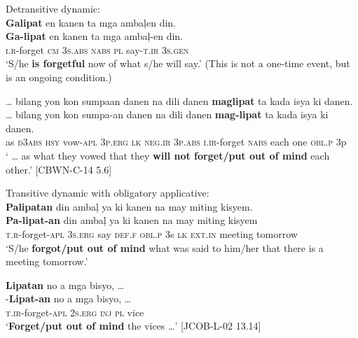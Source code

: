 \ea
Detransitive dynamic: \\
\textbf{Galipat}  en  kanen  ta  mga  ambaļen  din. \\\smallskip
\gll \textbf{Ga-lipat}  en  kanen  ta  mga  ambaļ-en  din. \\
\textsc{i.r}-forget  \textsc{cm}  3\textsc{s.abs}  \textsc{nabs}  \textsc{pl}  say-\textsc{t.ir}  3\textsc{s.gen} \\
\glt ‘S/he \textbf{is forgetful} now of what s/he will say.’ (This is not a one-time event, but is an ongoing condition.)
\z

\ea
… bilang  yon  kon  sumpaan  danen  na  dili  danen  \textbf{maglipat} ta  kada  isya  ki  danen. \\\smallskip
\gll  … bilang  yon  kon  sumpa-an  danen  na  dili  danen  \textbf{mag-lipat} ta  kada  isya  ki  danen. \\
{} as  \textsc{d3abs}  \textsc{hsy}  vow-\textsc{apl}  3\textsc{p.erg}  \textsc{lk}  \textsc{neg.ir}  3\textsc{p.abs}  \textsc{i.ir}-forget \textsc{nabs}  each  one  \textsc{obl.p}  3p \\
\glt ` … as what they vowed that they \textbf{will not forget/put out of mind} each other.’ [CBWN-C-14 5.6] 
\z

\newpage
\ea
Transitive dynamic with obligatory applicative: \\
\textbf{Palipatan}  din  ambaļ  ya  ki  kanen  na  may  miting  kisyem. \\\smallskip
\gll \textbf{Pa-lipat-an}  din  ambaļ  ya  ki  kanen  na  may  miting  kisyem \\
\textsc{t.r}-forget-\textsc{apl}  3\textsc{s.erg}  say  \textsc{def.f}  \textsc{obl.p}  3s  \textsc{lk}  \textsc{ext.in}  meeting  tomorrow \\
\glt ‘S/he \textbf{forgot/put out of mind} what was said to him/her that there is a meeting tomorrow.’
\z

\ea
\textbf{Lipatan}  no  a  mga  bisyo, … \\\smallskip
\gll \emptyset{}-\textbf{Lipat-an}  no  a  mga  bisyo, … \\
\textsc{t.ir}-forget-\textsc{apl}  2\textsc{s.erg}  \textsc{inj}  \textsc{pl}  vice \\
\glt ‘\textbf{Forget/put out of mind} the vices …’ [JCOB-L-02 13.14]
\z

